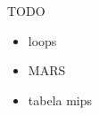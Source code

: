 \begin{frame}{TODO}
  
  \begin{itemize}
  \item loops
  \item MARS
  \item tabela mips
  \end{itemize}

\end{frame}

